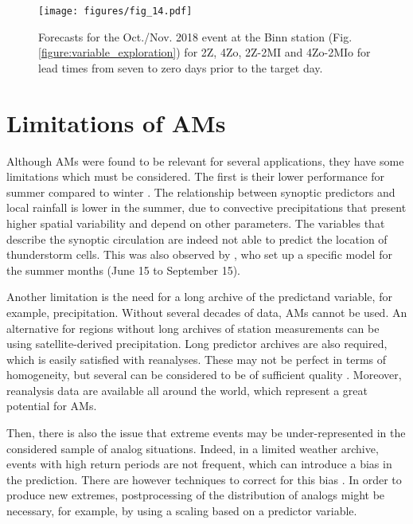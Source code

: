 \documentclass[review]{elsarticle}
\begin{document}
\begin{figure*}[hbt!]
	\texttt{[image: figures/fig\_14.pdf]}
	\caption{Forecasts for the Oct./Nov. 2018 event at the Binn station (Fig. \ref{figure:variable_exploration}) for 2Z, 4Zo, 2Z-2MI and 4Zo-2MIo for lead times from seven to zero days prior to the target day.}
	\label{figure:operational_2018}
\end{figure*}
\clearpage

\section{Limitations of AMs}
\label{sec:limitations}

Although AMs were found to be relevant for several applications, they have some limitations which must be considered. The first is their lower performance for summer compared to winter \citep{Bliefernicht2010}. The relationship between synoptic predictors and local rainfall is lower in the summer, due to convective precipitations that present higher spatial variability and depend on other parameters. The variables that describe the synoptic circulation are indeed not able to predict the location of thunderstorm cells. This was also observed by \citet{BenDaoud2010}, who set up a specific model for the summer months (June 15 to September 15).

Another limitation is the need for a long archive of the predictand variable, for example, precipitation. Without several decades of data, AMs cannot be used. An alternative for regions without long archives of station measurements can be using satellite-derived precipitation. Long predictor archives are also required, which is easily satisfied with reanalyses. These may not be perfect in terms of homogeneity, but several can be considered to be of sufficient quality \cite{Horton2018b}. Moreover, reanalysis data are available all around the world, which represent a great potential for AMs.

Then, there is also the issue that extreme events may be under-represented in the considered sample of analog situations. Indeed, in a limited weather archive, events with high return periods are not frequent, which can introduce a bias in the prediction. There are however techniques to correct for this bias \citep[see][]{Marty2010}. In order to produce new extremes, postprocessing of the distribution of analogs might be necessary, for example, by using a scaling based on a predictor variable. 
\end{document}
